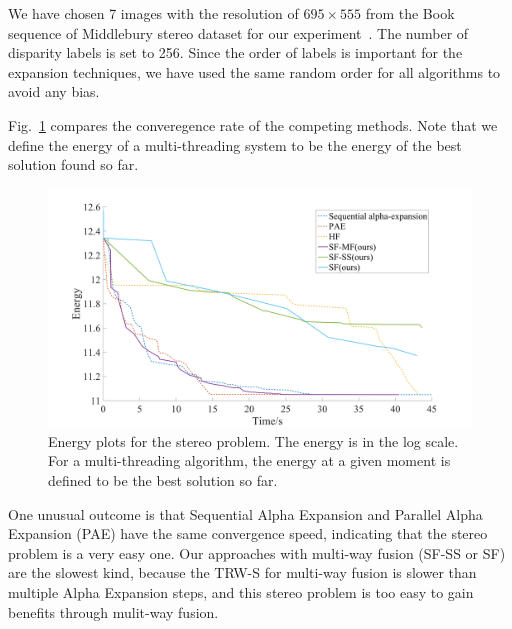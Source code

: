 
\noindent We have chosen 7 images with the resolution of $695\times555$
from the Book sequence of Middlebury stereo dataset for our
experiment~\cite{middlebury_stereo}. The number of disparity labels is
set to 256.
%
Since the order of labels is important for the expansion techniques,
we have used the same random order for all algorithms to avoid any
bias.
%



Fig.~\ref{fig:stereo_global} compares the converegence rate of the
competing methods. Note that we define the energy of a multi-threading
system to be the energy of the best solution found so far.
%
\begin{figure}[tb]
  \includegraphics[width=\columnwidth]{figure/stereo_global.png}
 \caption{Energy plots for the stereo problem. The energy is in the log
 scale. For a multi-threading algorithm, the energy at a given moment is
 defined to be the best solution so far.} \label{fig:stereo_global}
\end{figure}
%
One unusual outcome is that Sequential Alpha Expansion and Parallel
Alpha Expansion (PAE) have the same convergence speed, indicating that
the stereo problem is a very easy one.
Our approaches with multi-way fusion (SF-SS or SF) are the slowest kind,
because the TRW-S for multi-way fusion is slower than multiple Alpha
Expansion steps, and this stereo problem is too easy to gain benefits
through mulit-way fusion.
%
